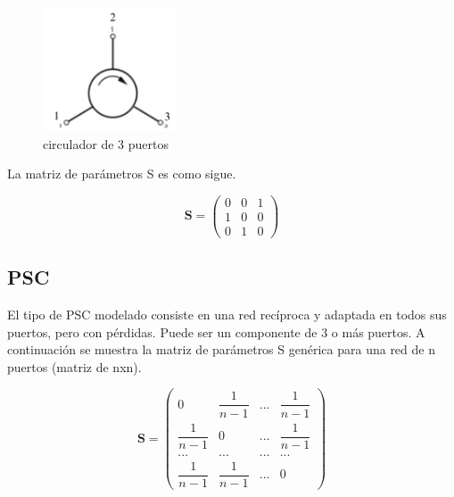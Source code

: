 \begin{figure}[H]
 \centering
 \includegraphics[width=4cm]{gfx/circulator.png}
 \caption{circulador de 3 puertos}
 \label{fig:circulator}
\end{figure}

La matriz de parámetros S es como sigue.

$$
\mathbf{S} = \begin{pmatrix} 0 & 0 & 1\\1 & 0 & 0\\0 & 1 & 0\end{pmatrix}
$$


\subsection{PSC}

El tipo de PSC modelado consiste en una red recíproca y adaptada en todos sus puertos, pero con pérdidas. Puede ser un 
componente de 3 o más puertos. A continuación se muestra la matriz de parámetros S genérica para una red de n puertos 
(matriz de nxn).

$$
\mathbf{S} = \begin{pmatrix} 0 & \dfrac{1}{n-1} & ... & \dfrac{1}{n-1}\\
							 \dfrac{1}{n-1} & 0 & ... & \dfrac{1}{n-1}\\
							 ... & ... & ... & ... \\
							 \dfrac{1}{n-1} & \dfrac{1}{n-1} & ... & 0 \end{pmatrix}
$$





